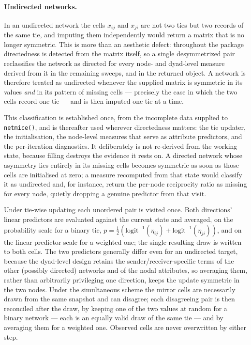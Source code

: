 \documentclass[11pt,a4paper]{article}
\newcommand{\code}[1]{\texttt{#1}}
\begin{document}
\paragraph{Undirected networks.} In an undirected network the cells
$x_{ij}$ and $x_{ji}$ are not two ties but two records of the same tie, and
imputing them independently would return a matrix that is no longer
symmetric. This is more than an aesthetic defect: throughout the package
directedness is detected from the matrix itself, so a single desymmetrized
pair reclassifies the network as directed for every node- and dyad-level
measure derived from it in the remaining sweeps, and in the returned
object. A network is therefore treated as undirected whenever the supplied
matrix is symmetric in its values \emph{and} in its pattern of missing
cells --- precisely the case in which the two cells record one tie --- and
is then imputed one tie at a time.

This classification is established once, from the incomplete data supplied
to \code{netmice()}, and is thereafter used wherever directedness matters:
the tie updater, the initialisation, the node-level measures that serve as
attribute predictors, and the per-iteration diagnostics. It deliberately is
not re-derived from the working state, because filling destroys the
evidence it rests on. A directed network whose asymmetry lies entirely in
its missing cells becomes symmetric as soon as those cells are initialised
at zero; a measure recomputed from that state would classify it as
undirected and, for instance, return the per-node reciprocity ratio as
missing for every node, quietly dropping a genuine predictor from that
visit.

Under tie-wise updating each unordered pair is visited once. Both
directions' linear predictors are evaluated against the current state and
averaged, on the probability scale for a binary tie,
$p = \tfrac{1}{2}\left(\mathrm{logit}^{-1}(\eta_{ij}) +
\mathrm{logit}^{-1}(\eta_{ji})\right)$, and on the linear predictor scale
for a weighted one; the single resulting draw is written to both cells. The
two predictors generally differ even for an undirected target, because the
dyad-level design retains the sender/receiver-specific terms of the other
(possibly directed) networks and of the nodal attributes, so averaging
them, rather than arbitrarily privileging one direction, keeps the update
symmetric in the two nodes. Under the simultaneous scheme the mirror cells
are necessarily drawn from the same snapshot and can disagree; each
disagreeing pair is then reconciled after the draw, by keeping one of the
two values at random for a binary network --- each is an equally valid draw
of the same tie --- and by averaging them for a weighted one. Observed
cells are never overwritten by either step.
\end{document}
